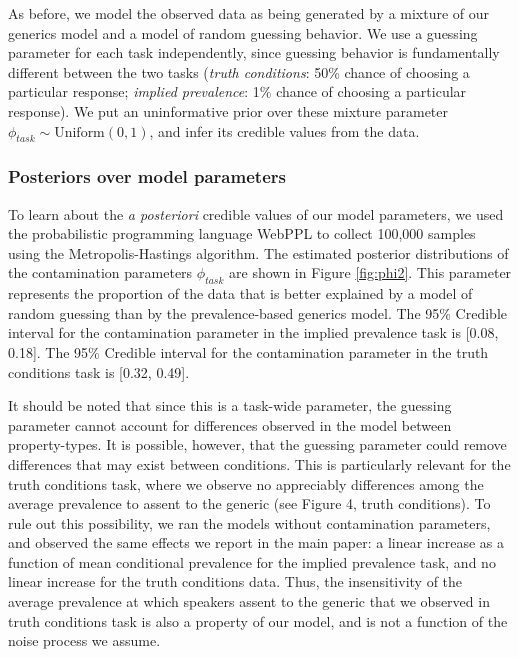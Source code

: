 \documentclass[10pt,letterpaper]{article}
\begin{document}
As before, we model the observed data as being generated by a mixture of our generics model and a model of random guessing behavior. 
We use a guessing parameter for each task independently, since guessing behavior is fundamentally different between the two tasks (\emph{truth conditions}: 50\% chance of choosing a particular response; \emph{implied prevalence}: 1\% chance of choosing a particular response).
We put an uninformative prior over these mixture parameter $\phi_{task} \sim \text{Uniform}(0,1)$, and infer its credible values from the data.

\subsubsection{Posteriors over model parameters}

To learn about the \emph{a posteriori} credible values of our model parameters, we used the probabilistic programming language WebPPL \cite{dippl} to collect 100,000 samples using the Metropolis-Hastings algorithm. 
The estimated posterior distributions of the contamination parameters $\phi_{task}$ are shown in Figure \ref{fig:phi2}. 
This parameter represents the proportion of the data that is better explained by a model of random guessing than by the prevalence-based generics model. 
The 95\% Credible interval for the contamination parameter in the implied prevalence task is [0.08, 0.18]. 
The 95\% Credible interval for the contamination parameter in the truth conditions task is [0.32, 0.49]. 

It should be noted that since this is a task-wide parameter, the guessing parameter cannot account for differences observed in the model between property-types.
It is possible, however, that the guessing parameter could remove differences that may exist between conditions. 
This is particularly relevant for the truth conditions task, where we observe no appreciably differences among the average prevalence to assent to the generic (see Figure 4, truth conditions). To rule out this possibility, we ran the models without contamination parameters, and observed the same effects we report in the main paper: a linear increase as a function of mean conditional prevalence for the implied prevalence task, and no linear increase for the truth conditions data. 
Thus, the insensitivity of the average prevalence at which speakers assent to the generic that we observed in truth conditions task is also a property of our model, and is not a function of the noise process we assume.
\end{document}
